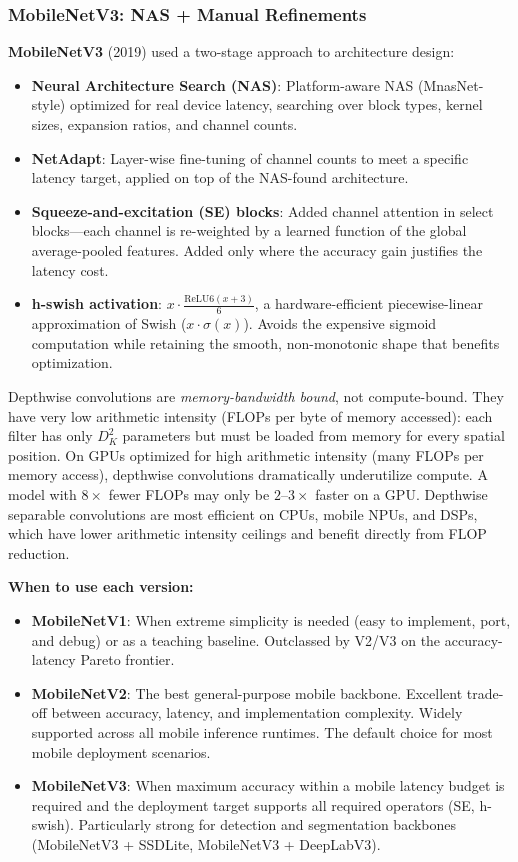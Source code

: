 \subsubsection*{MobileNetV3: NAS + Manual Refinements}

\textbf{MobileNetV3} (2019) used a two-stage approach to architecture design:
\begin{itemize}
    \item \textbf{Neural Architecture Search (NAS)}: Platform-aware NAS (MnasNet-style) optimized for real device latency, searching over block types, kernel sizes, expansion ratios, and channel counts.
    \item \textbf{NetAdapt}: Layer-wise fine-tuning of channel counts to meet a specific latency target, applied on top of the NAS-found architecture.
    \item \textbf{Squeeze-and-excitation (SE) blocks}: Added channel attention in select blocks---each channel is re-weighted by a learned function of the global average-pooled features. Added only where the accuracy gain justifies the latency cost.
    \item \textbf{h-swish activation}: $x \cdot \frac{\text{ReLU6}(x+3)}{6}$, a hardware-efficient piecewise-linear approximation of Swish ($x \cdot \sigma(x)$). Avoids the expensive sigmoid computation while retaining the smooth, non-monotonic shape that benefits optimization.
\end{itemize}

\begin{warningbox}
Depthwise convolutions are \textit{memory-bandwidth bound}, not compute-bound. They have very low arithmetic intensity (FLOPs per byte of memory accessed): each filter has only $D_K^2$ parameters but must be loaded from memory for every spatial position. On GPUs optimized for high arithmetic intensity (many FLOPs per memory access), depthwise convolutions dramatically underutilize compute. A model with $8 \times$ fewer FLOPs may only be $2$--$3 \times$ faster on a GPU. Depthwise separable convolutions are most efficient on CPUs, mobile NPUs, and DSPs, which have lower arithmetic intensity ceilings and benefit directly from FLOP reduction.
\end{warningbox}

\textbf{When to use each version:}
\begin{itemize}
    \item \textbf{MobileNetV1}: When extreme simplicity is needed (easy to implement, port, and debug) or as a teaching baseline. Outclassed by V2/V3 on the accuracy-latency Pareto frontier.
    \item \textbf{MobileNetV2}: The best general-purpose mobile backbone. Excellent trade-off between accuracy, latency, and implementation complexity. Widely supported across all mobile inference runtimes. The default choice for most mobile deployment scenarios.
    \item \textbf{MobileNetV3}: When maximum accuracy within a mobile latency budget is required and the deployment target supports all required operators (SE, h-swish). Particularly strong for detection and segmentation backbones (MobileNetV3 + SSDLite, MobileNetV3 + DeepLabV3).
\end{itemize}

